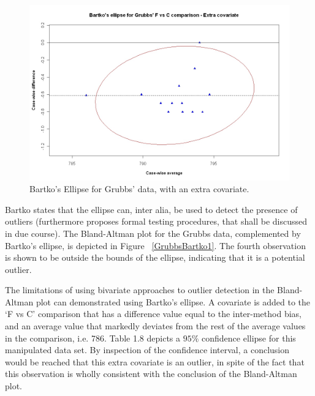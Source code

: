 \documentclass[12pt, a4paper]{report}
\theoremstyle{plain}
\theoremstyle{definition}
\theoremstyle{remark}
\begin{document}
\begin{figure}[h!]
	\includegraphics[width=130mm]{images/GrubbsBartko2.jpeg}
	\caption{Bartko's Ellipse for Grubbs' data, with an extra covariate.}\label{GrubbsBartko2}
\end{figure}




Bartko states that the ellipse can, inter alia, be used to detect the presence of outliers (furthermore
\citet{Bartko} proposes formal testing procedures, that shall be discussed in due course). 
The Bland-Altman plot for the Grubbs data, complemented by Bartko's ellipse, is depicted in Figure ~\ref{GrubbsBartko1}.
The fourth observation is shown to be outside the bounds of the ellipse, indicating that it is a potential outlier.




The limitations of using bivariate approaches to outlier detection
in the Bland-Altman plot can demonstrated using Bartko's ellipse.
A covariate is added to the `F vs C' comparison that has a
difference value equal to the inter-method bias, and an average
value that markedly deviates from the rest of the average values
in the comparison, i.e. 786. Table 1.8 depicts a $95\%$ confidence
ellipse for this manipulated data set. By inspection of the
confidence interval, a conclusion would be reached that this extra
covariate is an outlier, in spite of the fact that this
observation is wholly consistent with the conclusion of the
Bland-Altman plot.

\end{document}
